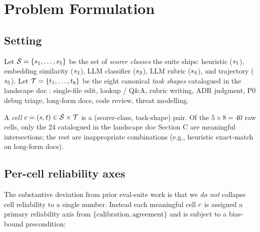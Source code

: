\section{Problem Formulation}
\label{sec:problem}


\subsection{Setting}

Let $\mathcal{S} = \{s_1, \ldots, s_5\}$
be the set of \emph{scorer classes} the suite ships:
heuristic ($s_1$), embedding similarity ($s_2$),
LLM classifier ($s_3$), LLM rubric ($s_4$), and
trajectory ($s_5$). Let
$\mathcal{T} = \{t_1, \ldots, t_8\}$ be the eight
canonical \emph{task shapes} catalogued in the landscape doc
\cite{blackrim_evalsuite_landscape}: single-file edit, lookup / Q\&A,
rubric writing, ADR judgment, P0 debug triage, long-form docs,
code review, threat modelling.

A \emph{cell} $c = (s, t) \in
\mathcal{S} \times \mathcal{T}$ is a (scorer-class, task-shape) pair.
Of the $5 \times 8 = 40$ raw cells, only the 24 catalogued in the
landscape doc Section C are meaningful intersections; the rest are
inappropriate combinations (e.g., heuristic exact-match on long-form
docs).

\subsection{Per-cell reliability axes}

The substantive deviation from prior eval-suite work is that we
\emph{do not} collapse cell reliability to a single number. Instead
each meaningful cell $c$ is assigned a primary reliability
axis from $\{\text{calibration}, \text{agreement}\}$ and is subject
to a bias-bound precondition:

